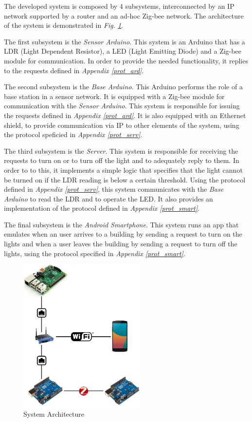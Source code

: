 \documentclass[conference, a4paper]{IEEEtran}
\begin{document}
The developed system is composed by 4 subsystems, interconnected by an IP network supported by a router and an ad-hoc Zig-bee network. The architecture of the system is demonstrated in \textit{Fig. \ref{fig_arch}}.

The first subsystem is the \textit{Sensor Arduino}. This system is an Arduino that has a LDR (Light Dependent Resistor), a LED (Light Emitting Diode) and a Zig-bee module for communication. In order to provide the needed functionality, it replies to the requests defined in \textit{Appendix \ref{prot_ard}}.

The second subsystem is the \textit{Base Arduino}. This Arduino performs the role of a base station in a sensor network. It is equipped with a Zig-bee module for communication with the \textit{Sensor Arduino}. This system is responsible for issuing the requests defined in \textit{Appendix \ref{prot_ard}}. It is also equipped with an Ethernet shield, to provide communication via IP to other elements of the system, using the protocol speficied in \textit{Appendix \ref{prot_serv}}.

The third subsystem is the \textit{Server}. This system is responsible for receiving the requests to turn on or to turn off the light and to adequately reply to them. In order to to this, it implements a simple logic that specifies that the light cannot be turned on if the LDR reading is below a certain threshold. Using the protocol defined in \textit{Appendix \ref{prot_serv}}, this system communicates with the \textit{Base Arduino} to read the LDR and to operate the LED. It also provides an implementation of the protocol defined in \textit{Appendix \ref{prot_smart}}.

The final subsystem is the \textit{Android Smartphone}. This system runs an app that emulates when an user arrives to a building by sending a request to turn on the lights and when a user leaves the building by sending a request to turn off the lights, using the protocol specified in \textit{Appendix \ref{prot_smart}}.

\begin{figure}[H]
\centering
\includegraphics[width=2.5in]{Architecture}
\caption{System Architecture}
\label{fig_arch}
\end{figure}
\end{document}
